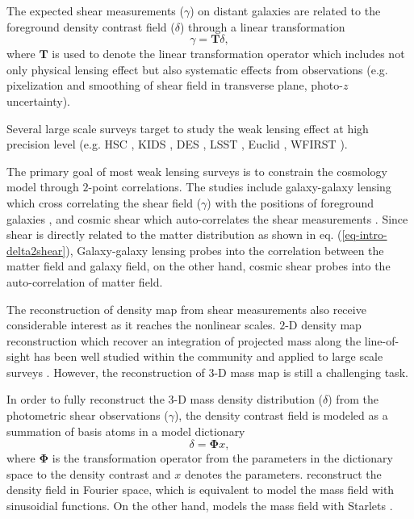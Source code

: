\documentclass[twocolumn]{aastex62}
\begin{document}
The expected shear measurements ($\gamma$) on distant galaxies are related to the 
foreground density contrast field ($\delta$) through a linear transformation
\begin{equation} \label{eq-intro-delta2shear}
 \gamma=\mathbf{T} \delta,
\end{equation}
where $\mathbf{T}$ is used to denote the linear transformation operator which includes not only physical lensing effect
but also systematic effects from observations (e.g. pixelization and smoothing of shear field in
transverse plane, photo-$z$ uncertainty).

Several large scale surveys target to study the weak lensing effect at high precision level (e.g. HSC \citep{HSC1-data}, KIDS
\citep{KIDS13}, DES \citep{DES05}, LSST \citep{LSSTScienceBook}, Euclid \citep{Euclid2011}, WFIRST \citep{WFIRST15}).

The primary goal of most weak lensing surveys is to constrain the cosmology model through $2$-point correlations. The studies
include galaxy-galaxy lensing which cross correlating the shear field ($\gamma$) with the positions of foreground galaxies
\citep{gglens-GAMA-Han2014,gglens-BossCFHTMore2015,gglens-DES1},
and cosmic shear which auto-correlates the shear measurements
\citep{cosmicShearRealKids450,cosmicShear-DES1,cosmicShear_HSC1_Chiaki2019,cosmicShear_HSC1_Hamana2019}.
Since shear is directly related to the matter distribution as shown in eq. (\ref{eq-intro-delta2shear}), Galaxy-galaxy lensing
probes into the correlation between the matter field and galaxy field, on the other hand, cosmic shear probes into the
auto-correlation of matter field.

The reconstruction of density map from shear measurements also receive considerable interest as it reaches the nonlinear scales. 
$2$-D density map reconstruction which recover an integration of projected mass along the line-of-sight has been well studied 
within the community \citep{massMap-KS1993,WL-massMap-Glimpse2D-Lanusse2016,sparseBaysianMassMap-Price2020}
and applied to large scale surveys \citep{HSC1-massMaps,massMapDES-Chang2018,DES-SV-massMap-sparsity}. However, the 
reconstruction of $3$-D mass map is still a challenging task.

In order to fully reconstruct the $3$-D mass density distribution ($\delta$) from the photometric shear observations ($\gamma$),
the density contrast field is modeled as a summation of basis atoms in a model dictionary
\begin{equation} \label{eq-intro-dict}
 \delta= \mathbf{\Phi} x,
\end{equation}
where $\mathbf{\Phi}$ is the transformation operator from the parameters in the dictionary space to the density contrast 
and $x$ denotes the parameters. \citet{LSS-massMap-Wiener-Simon2009} reconstruct the density field
in Fourier space, which is equivalent to model the mass field with sinusoidial functions. On the other hand,
\citet{LSS-massMap-Glimpse3D-Leonard2014} models the mass field with Starlets \citep{Starlet-Starck2015}.
\end{document}

